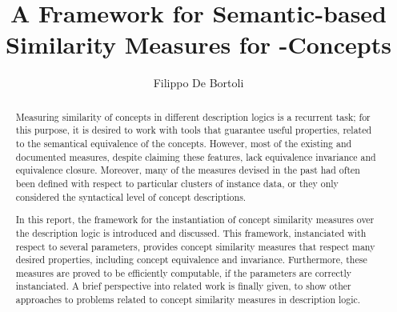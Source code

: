 \documentclass{llncs}
\title{A Framework for Semantic-based Similarity Measures for \elh-Concepts}
\author{Filippo De Bortoli}
\institute{European Master's Program in Computational Logic, TU Dresden}%
\begin{document}
  \maketitle

  \begin{abstract}
    Measuring similarity of concepts in different description logics is a recurrent task; for this purpose, it is desired to work with tools that guarantee useful properties, related to the semantical equivalence of the concepts.
    However, most of the existing and documented measures, despite claiming these features, lack equivalence invariance and equivalence closure.
    Moreover, many of the measures devised in the past had often been defined with respect to particular clusters of instance data, or they only considered the syntactical level of concept descriptions.

    In this report, the \simi framework for the instantiation of concept similarity measures over the \elh description logic is introduced and discussed.
    This framework, instanciated with respect to several parameters, provides concept similarity measures that respect many desired properties, including concept equivalence and invariance.
    Furthermore, these measures are proved to be efficiently computable, if the parameters are correctly instanciated.
    A brief perspective into related work is finally given, to show other approaches to problems related to concept similarity measures in description logic.
  \end{abstract}

  
  
  
  
  
  
\end{document}
